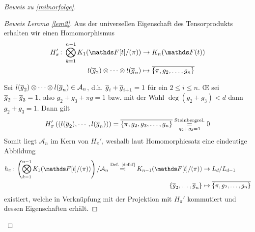 \documentclass[ngerman,fontsize=11pt, paper=a4, parskip=half, titlepage=true, toc=bib]{scrartcl}
\begin{document}
\begin{proof}[Beweis zu \ref{milnorfolge}]
\begin{proof}[Beweis Lemma \ref{lem2}]
    Aus der universellen Eigenschaft des Tensorprodukts erhalten wir
    einen Homomorphismus
    \begin{align*}
      H_\pi'\colon\bigotimes_{k=1}^{n-1}\K_1(\Ftpi)
      &\to\KnFt\\
      l(\ov g_2)\otimes\dotsb\otimes l(\ov g_n)
      &\mapsto \ov{\{\pi,g_2,\dotsc,g_n\}}
    \end{align*}
    
    Sei $l(\overline g_2)\otimes\dotsb\otimes l(\overline g_n)\in\mathcal{A}_n$,
    d.h. $\overline g_i+\overline g_{i+1}=1$ für ein $2\leq i\leq n$.
    \OE{} sei $\overline g_2 + \overline g_3=1$, 
    also $g_2 + g_3 +\pi g=1$ bzw. mit der Wahl
    $\deg(g_2+g_3)<d$ dann $g_2+g_3=1$. Dann gilt
    \begin{gather*}
      H'_\pi\left(\left(l(\overline g_2),\dotsb,l(\overline g_n)\right)\right)
      = \overline{\{\pi,g_2,g_3, \dotsc,g_n\}}
      \overset{\text{Steinbergrel.}}{\underset{g_2+g_3=1}{=}} 0
    \end{gather*}
    Somit liegt $\mathcal{A}_n$ im Kern von $H_\pi'$, weshalb laut
    Homomorphiesatz eine eindeutige Abbildung
    \begin{align*}
      h_\pi\colon 
      \left(\bigotimes_{k=1}^{n-1}\K_1(\Ftpi)\right)/\mathcal{A}_n
      \overset{\text{Def. \ref{defkf}}}{\eqqcolon}
      \K_{n-1}(\Ftpi)&\to L_d/L_{d-1}\\
      \{\ov g_2,\dotsc,\ov g_n\}&\mapsto \ov{\{\pi,g_2,\dotsc,g_n\}}
    \end{align*}
    existiert, welche in Verknüpfung mit der Projektion mit 
    $H_\pi'$ kommutiert und dessen Eigenschaften erhält.


\end{proof}
\end{proof}
\end{document}
